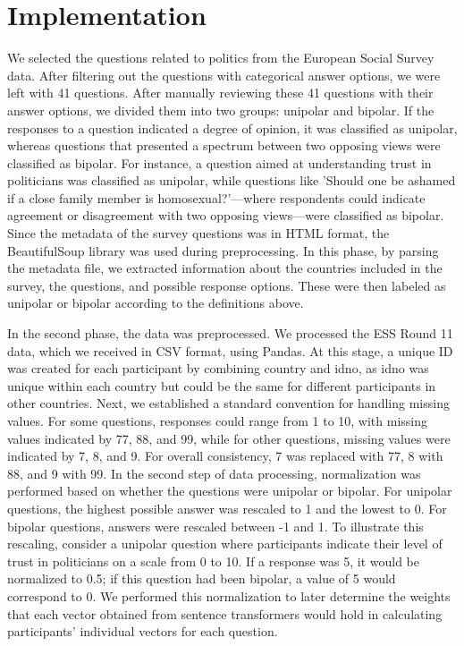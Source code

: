 \section*{Implementation}

We selected the questions related to politics from the European Social Survey data. After filtering out the questions with categorical answer options, we were left with 41 questions. After manually reviewing these 41 questions with their answer options, we divided them into two groups: unipolar and bipolar. If the responses to a question indicated a degree of opinion, it was classified as unipolar, whereas questions that presented a spectrum between two opposing views were classified as bipolar. For instance, a question aimed at understanding trust in politicians was classified as unipolar, while questions like 'Should one be ashamed if a close family member is homosexual?'—where respondents could indicate agreement or disagreement with two opposing views—were classified as bipolar. Since the metadata of the survey questions was in HTML format, the BeautifulSoup library was used during preprocessing. In this phase, by parsing the metadata file, we extracted information about the countries included in the survey, the questions, and possible response options. These were then labeled as unipolar or bipolar according to the definitions above.

In the second phase, the data was preprocessed. We processed the ESS Round 11 data, which we received in CSV format, using Pandas. At this stage, a unique ID was created for each participant by combining country and idno, as idno was unique within each country but could be the same for different participants in other countries. Next, we established a standard convention for handling missing values. For some questions, responses could range from 1 to 10, with missing values indicated by 77, 88, and 99, while for other questions, missing values were indicated by 7, 8, and 9. For overall consistency, 7 was replaced with 77, 8 with 88, and 9 with 99. In the second step of data processing, normalization was performed based on whether the questions were unipolar or bipolar. For unipolar questions, the highest possible answer was rescaled to 1 and the lowest to 0. For bipolar questions, answers were rescaled between -1 and 1. To illustrate this rescaling, consider a unipolar question where participants indicate their level of trust in politicians on a scale from 0 to 10. If a response was 5, it would be normalized to 0.5; if this question had been bipolar, a value of 5 would correspond to 0. We performed this normalization to later determine the weights that each vector obtained from sentence transformers would hold in calculating participants' individual vectors for each question.


